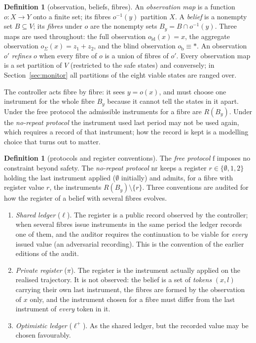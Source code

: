 \documentclass[11pt,a4paper]{article}
\theoremstyle{plain}
\theoremstyle{definition}
\newtheorem{definition}[theorem]{Definition}
\theoremstyle{remark}
\newcommand{\led}{\ell}
\newcommand{\priv}{\pi}
\newcommand{\opt}{\ell^{+}}
\newcommand{\free}{\mathrm{f}}
\newcommand{\nr}{\mathrm{nr}}
\newcommand{\ofull}{o_{\mathrm{id}}}
\newcommand{\oagg}{o_{\Sigma}}
\newcommand{\oblind}{o_{\mathrm{b}}}
\begin{document}
\begin{definition}[observation, beliefs, fibres]\label{def:obs}
An \emph{observation map} is a function $o:X\to Y$ onto a finite set; its fibres $o^{-1}(y)$ partition $X$. A \emph{belief} is a nonempty set $B\subseteq V$; its \emph{fibres} under $o$ are the nonempty sets $B_y=B\cap o^{-1}(y)$. Three maps are used throughout: the full observation $\ofull(x)=x$, the aggregate observation $\oagg(x)=z_1+z_2$, and the blind observation $\oblind\equiv\ast$. An observation $o'$ \emph{refines} $o$ when every fibre of $o$ is a union of fibres of $o'$. Every observation map is a set partition of $V$ (restricted to the safe states) and conversely; in Section~\ref{sec:monitor} all partitions of the eight viable states are ranged over.
\end{definition}

The controller acts fibre by fibre: it sees $y=o(x)$, and must choose one instrument for the whole fibre $B_y$ because it cannot tell the states in it apart. Under the free protocol the admissible instruments for a fibre are $R(B_y)$. Under the \emph{no-repeat protocol} the instrument used last period may not be used again, which requires a record of that instrument; how the record is kept is a modelling choice that turns out to matter.

\begin{definition}[protocols and register conventions]\label{def:protocol}
The \emph{free protocol} $\free$ imposes no constraint beyond safety. The \emph{no-repeat protocol} $\nr$ keeps a register $r\in\{\emptyset,1,2\}$ holding the last instrument applied ($\emptyset$ initially) and admits, for a fibre with register value $r$, the instruments $R(B_y)\setminus\{r\}$. Three conventions are audited for how the register of a belief with several fibres evolves.
\begin{enumerate}[leftmargin=2em,itemsep=1pt]
\item \emph{Shared ledger} ($\led$). The register is a public record observed by the controller; when several fibres issue instruments in the same period the ledger records one of them, and the auditor requires the continuation to be viable for \emph{every} issued value (an adversarial recording). This is the convention of the earlier editions of the audit.
\item \emph{Private register} ($\priv$). The register is the instrument actually applied on the realised trajectory. It is not observed: the belief is a set of \emph{tokens} $(x,l)$ carrying their own last instrument, the fibres are formed by the observation of $x$ only, and the instrument chosen for a fibre must differ from the last instrument of \emph{every} token in it.
\item \emph{Optimistic ledger} ($\opt$). As the shared ledger, but the recorded value may be chosen favourably.
\end{enumerate}
\end{definition}
\end{document}
